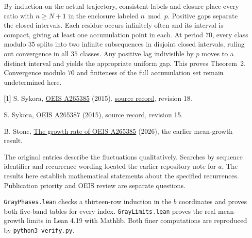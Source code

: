 \documentclass[11pt,letterpaper]{article}
\newcommand{\hd}[1]{\vspace{6pt}{\large\bfseries\color{accent}#1}\par}
\newcommand{\link}[2]{\href{#1}{#2}}
\begin{document}
By induction on the actual trajectory, consistent labels and closure place every ratio with $n\ge N+1$ in the enclosure labeled $n\bmod p$. Positive gaps separate the closed intervals. Each residue occurs infinitely often and its interval is compact, giving at least one accumulation point in each. At period $70$, every class modulo $35$ splits into two infinite subsequences in disjoint closed intervals, ruling out convergence in all $35$ classes. Any positive lag indivisible by $p$ moves to a distinct interval and yields the appropriate uniform gap. This proves Theorem~2. Convergence modulo $70$ and finiteness of the full accumulation set remain undetermined here.

\hd{Sources and verification}
{\small
[1] S. Sykora, \link{https://oeis.org/A265385}{OEIS A265385} (2015), \link{https://github.com/oeis/oeisdata/blob/main/seq/A265/A265385.seq}{source record}, revision 18.\par
[2] S. Sykora, \link{https://oeis.org/A265387}{OEIS A265387} (2015), \link{https://github.com/oeis/oeisdata/blob/main/seq/A265/A265387.seq}{source record}, revision 15.\par
[3] B. Stone, \link{https://github.com/blakestone-x/math/tree/a80ee14b88981065189113eace98e1b8fba58c28/A265385}{The growth rate of OEIS A265385} (2026), the earlier mean-growth result.\par
The original entries describe the fluctuations qualitatively. Searches by sequence identifier and recurrence wording located the earlier repository note for $a$. The results here establish mathematical statements about the specified recurrences. Publication priority and OEIS review are separate questions.\par
\texttt{GrayPhases.lean} checks a thirteen-row induction in the $b$ coordinates and proves both five-band tables for every index. \texttt{GrayLimits.lean} proves the real mean-growth limits in Lean 4.19 with Mathlib. Both finer computations are reproduced by \texttt{python3 verify.py}.}
\end{document}
